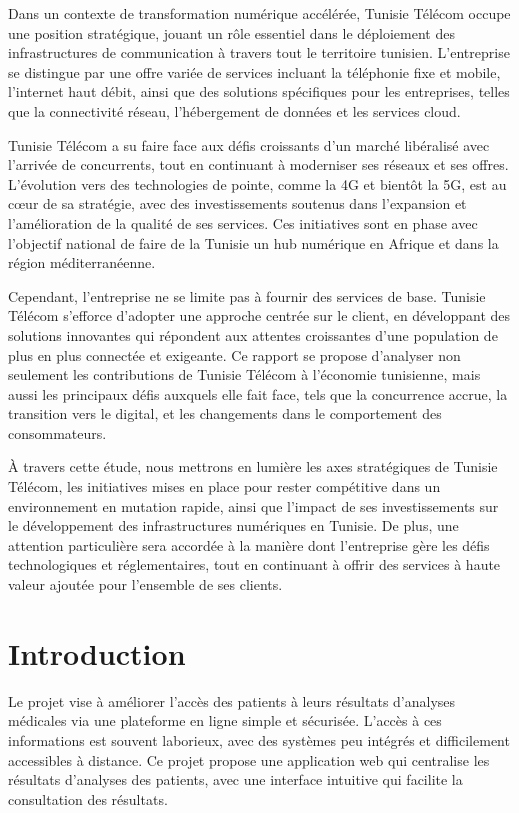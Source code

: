 \documentclass[12pt,a4paper]{report}
\begin{document}
Dans un contexte de transformation numérique accélérée, Tunisie Télécom occupe une position stratégique, jouant un rôle essentiel dans le déploiement des infrastructures de communication à travers tout le territoire tunisien. L’entreprise se distingue par une offre variée de services incluant la téléphonie fixe et mobile, l’internet haut débit, ainsi que des solutions spécifiques pour les entreprises, telles que la connectivité réseau, l’hébergement de données et les services cloud.

Tunisie Télécom a su faire face aux défis croissants d’un marché libéralisé avec l’arrivée de concurrents, tout en continuant à moderniser ses réseaux et ses offres. L’évolution vers des technologies de pointe, comme la 4G et bientôt la 5G, est au cœur de sa stratégie, avec des investissements soutenus dans l’expansion et l’amélioration de la qualité de ses services. Ces initiatives sont en phase avec l’objectif national de faire de la Tunisie un hub numérique en Afrique et dans la région méditerranéenne.

Cependant, l’entreprise ne se limite pas à fournir des services de base. Tunisie Télécom s’efforce d’adopter une approche centrée sur le client, en développant des solutions innovantes qui répondent aux attentes croissantes d’une population de plus en plus connectée et exigeante. Ce rapport se propose d’analyser non seulement les contributions de Tunisie Télécom à l’économie tunisienne, mais aussi les principaux défis auxquels elle fait face, tels que la concurrence accrue, la transition vers le digital, et les changements dans le comportement des consommateurs.

À travers cette étude, nous mettrons en lumière les axes stratégiques de Tunisie Télécom, les initiatives mises en place pour rester compétitive dans un environnement en mutation rapide, ainsi que l'impact de ses investissements sur le développement des infrastructures numériques en Tunisie. De plus, une attention particulière sera accordée à la manière dont l’entreprise gère les défis technologiques et réglementaires, tout en continuant à offrir des services à haute valeur ajoutée pour l'ensemble de ses clients.


\newpage
\section{Introduction}
Le projet vise à améliorer l'accès des patients à leurs résultats d'analyses médicales via une plateforme en ligne simple et sécurisée. L'accès à ces informations est souvent laborieux, avec des systèmes peu intégrés et difficilement accessibles à distance. Ce projet propose une application web qui centralise les résultats d'analyses des patients, avec une interface intuitive qui facilite la consultation des résultats.
\end{document}

